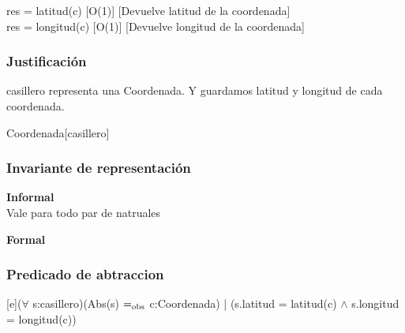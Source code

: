{res = latitud(c)}
[O(1)]
[Devuelve latitud de la coordenada]
\\

{res = longitud(c)}
[O(1)]
[Devuelve longitud de la coordenada]
\\

\begin{Representacion}
\subsubsection{Justificación}
casillero representa una Coordenada. Y guardamos latitud y longitud de cada coordenada.
	\begin{Estructura}{Coordenada}[casillero]
		\begin{Tupla}[casillero]
		\end{Tupla}
	\end{Estructura}
	
\subsubsection{Invariante de representación}

\textbf{Informal}\\

Vale para todo par de natruales

\textbf{Formal}\\


\subsubsection{Predicado de abtraccion}

[e]{($\forall$ s:casillero)(Abs(s) $=_{\mathrm{obs}}$ c:Coordenada) | (s.latitud = latitud(c) $\wedge$ s.longitud = longitud(c))}

\end{Representacion}

